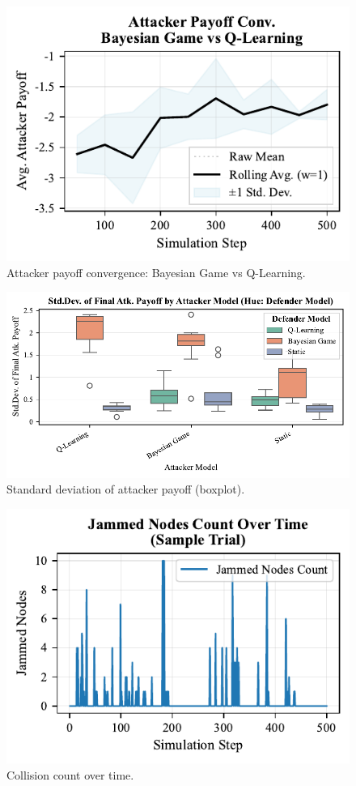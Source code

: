 \documentclass[conference]{IEEEtran}
\begin{document}
\begin{figure}[h!]
    \centering
    \includegraphics[width=0.9\linewidth]{figures/appendix/fig_atk_convergence_Bayesian_Game_vs_Q_Learning.pdf}
    \caption{Attacker payoff convergence: Bayesian Game vs Q-Learning.}
\end{figure}

\begin{figure}[h!]
    \centering
    \includegraphics[width=0.9\linewidth]{figures/appendix/fig_atk_payoff_stdev_boxplot.pdf}
    \caption{Standard deviation of attacker payoff (boxplot).}
\end{figure}

\begin{figure}[h!]
    \centering
    \includegraphics[width=0.9\linewidth]{figures/appendix/fig_collision_count_over_time.pdf}
    \caption{Collision count over time.}
\end{figure}
\end{document}
